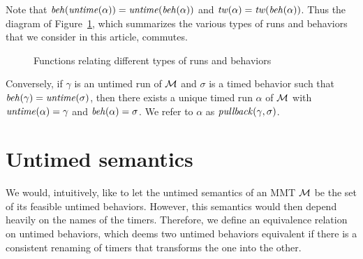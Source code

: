 Note that $\mathit{beh}(\mathit{untime}(\alpha))=\mathit{untime}(\mathit{beh}(\alpha))$ and $\mathit{tw}(\alpha) = \mathit{tw}(\mathit{beh}(\alpha))$.
Thus the diagram of Figure~\ref{fig:diagram}, which summarizes the various types of runs and behaviors that we consider
in this article, commutes.
\begin{figure}[h]
\centering
{}
\caption{Functions relating different types of runs and behaviors}
\label{fig:diagram}
\end{figure}
Conversely, if $\gamma$ is an untimed run  of ${\cal M}$ and $\sigma$ is a timed behavior such that $\mathit{beh}(\gamma) = \mathit{untime}(\sigma)$,
then there exists a unique timed run $\alpha$ of ${\cal M}$ with $\mathit{untime}(\alpha) = \gamma$ and $\mathit{beh}(\alpha) = \sigma$.
We refer to $\alpha$ as $\mathit{pullback}(\gamma,\sigma)$.

\section{Untimed semantics}
We would, intuitively, like to let the untimed semantics of an MMT ${\cal M}$ be the set of its feasible untimed behaviors.
However, this semantics would then depend heavily on the names of the timers. Therefore, we define an equivalence relation
on untimed behaviors, which deems two untimed behaviors equivalent if there is a consistent renaming of timers that transforms
the one into the other.

